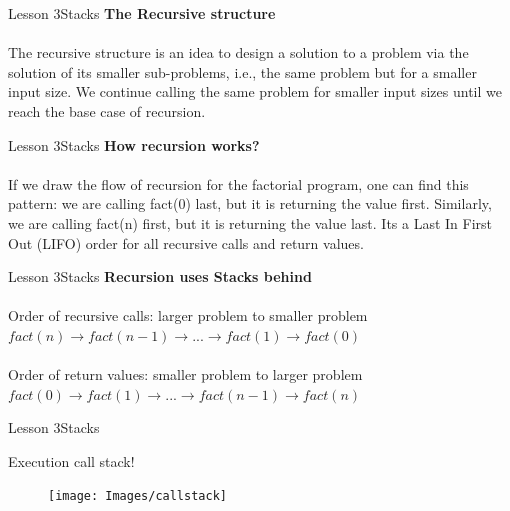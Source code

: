 \documentclass[aspectratio=1610]{beamer}
\begin{document}
\begin{frame}{Lesson 3}{Stacks}
\LARGE
\textbf{The Recursive structure}\\~\\
The recursive structure is an idea to design a solution to a problem
via the solution of its smaller sub-problems, i.e., the same problem
but for a smaller input size. We continue calling the same problem
for smaller input sizes until we reach the base case of recursion.
\end{frame}



\begin{frame}{Lesson 3}{Stacks}
\LARGE
\textbf{How recursion works?}\\~\\

If we draw the flow of recursion for the factorial program, one can
find this pattern: we are calling fact(0) last, but it is returning
the value first. Similarly, we are calling fact(n) first, but it is
returning the value last. Its a Last In First Out (LIFO) order for
all recursive calls and return values.
\end{frame}



\begin{frame}{Lesson 3}{Stacks}
\LARGE
\textbf{Recursion uses Stacks behind}\\~\\
Order of recursive calls: larger problem to smaller problem
$fact(n) \rightarrow fact(n -1) \rightarrow ... 	\rightarrow fact(1) 	\rightarrow fact(0)$\\~\\
Order of return values: smaller problem to larger problem
$fact(0) \rightarrow fact(1) \rightarrow ... \rightarrow fact(n - 1) \rightarrow fact(n)$
\end{frame}


\begin{frame}{Lesson 3}{Stacks}
\LARGE
\begin{minipage}{0.50\textwidth}
    Execution call stack!
  \end{minipage}
\begin{minipage}{.0\textwidth}
      \begin{figure}
        \texttt{[image: Images/callstack]}
      \end{figure}
  \end{minipage}  
\end{frame}
\end{document}

